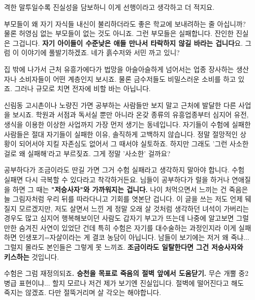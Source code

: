 격한 말투일수록 진실성을 담보하니 이게 선행이라고 생각하고 더 적지요.
\vspace{5mm}

부모들이 왜 자기 자식들 내신이 불리하더라도 좋은 학교에 보내려하는 줄 아십니까?
물론 허영심 없는 부모들이 없는 것도 아니죠. 그런 부모들은 실패합니다.
잔인한 진실은 그겁니다. \textbf{자기 아이들이 수준낮은 애들 만나서 타락하지 않길 바라는 겁니다}요.
그럼 이 이야기에 풀발기하겠죠. 네가 흙수저와 서민 까고 있니?
\vspace{5mm}

집 밖에 나가서 근처 유흥가에다가 법망을 아슬아슬하게 넘어서는 업종 장사하는 생산자나 소비자들이 어떤 계층인지 보시죠.
물론 금수저들도 비밀스러운 소비를 하고 있죠. 그러나 규모로 치면 전자에 비할 바는 아닙니다.
\vspace{5mm}

신림동 고시촌이나 노량진 가면 공부하는 사람들만 보지 말고 근처에 발달한 다른 사업을 보시죠.
학원과 서점과 독서실 뿐만 아니라 온갖 종류의 유흥업종부터 심지어 유전, 생식을 이용한 이상한 사업까지 가장 먼저 생기는 동네입니다.
자기들이 수험에 실패한 사람들은 절대 자기들이 실패한 이유, 솔직하게 고백하지 않습니다.
정말 절망적인 상황이 되어서야 지킬 자존심도 없어서 그 때서야 실토하죠. 하지만 그래도 '그런 사소한 걸로 왜 실패해'라고 부르짖죠.
그게 정말 '사소한' 걸까요?
\vspace{5mm}

공부하다가 조금이라도 딴길 가면 그거 수험 실패라고 생각하지 말아야 합니다.
수험 실패면 다시 극복할 수 있다라고 착각하거든요.
님들이 공부하다가 럴을 하거나 연애질을 하면 그 때는 \textbf{"저승사자"와 가까워지는 겁니다.}
나이 처먹으면서 느끼는 건 죽음은 늘 그림자처럼 우리 뒤를 따라다니고 기회를 엿본단 겁니다.
이 글을 쓰는 저도 언제 뒈질지 모르겠지만, 저도 살면서 느낀 게 정말 오래 살 것처럼 생각하던 녀석이 가버리는 경우도 많고
심지어 행복해보이던 사람도 갑자기 부고가 뜨는데 나중에 알고보면 그럴만한 숨겨진 사연이 있었단 건데
특히 수험은 자기를 대수술하는 과정인지라 이게 실패하면 인생포기=자살이라는 게 결코 농담이 아닙니다.
남들이 보기에는 저거 왜 죽냐... 그럴지 몰라도 본인들은 그렇게 못 느끼죠.
\textbf{조금이라도 일탈한다면 그건 저승사자와 키스하는} 것입니다.
\vspace{5mm}

수험은 그럼 재정의되죠\textbf{. 승천을 목표로 죽음의 절벽 앞에서 도움닫기.}
무슨 개뿔 중2병급 표현이냐... 할지 모르나 저건 제가 보기엔 진실입니다.
절벽에 떨어진다고 해도 죽지는 않겠죠. 다만 절뚝거리며 살 각오는 해야합니다.
\vspace{5mm}

